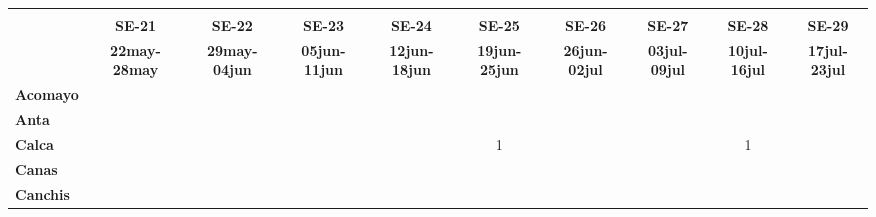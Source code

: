 \begin{tabular}{lccccccccc}
	\textbf{}              	  & \multicolumn{1}{l}{}                        & \multicolumn{1}{l}{}      & \multicolumn{1}{l}{}                         & \multicolumn{1}{l}{}                         & \multicolumn{1}{l}{}                         & \multicolumn{1}{l}{}                        & \multicolumn{1}{l}{}                         & \multicolumn{1}{l}{}                         & \multicolumn{1}{l}{}     \\
	\textbf{}                                                                          		
	&\textbf{SE-21}								&\textbf{SE-22}
	&\textbf{SE-23}								&\textbf{SE-24}	
	&\textbf{SE-25}								&\textbf{SE-26}
	&\textbf{SE-27}								&\textbf{SE-28}
	&\textbf{SE-29}\\
	\textbf{}              	  		
	&\textbf{22may-28may}
	&\textbf{29may-04jun}						&\textbf{05jun-11jun}
	&\textbf{12jun-18jun}						&\textbf{19jun-25jun}
	&\textbf{26jun-02jul}						&\textbf{03jul-09jul}
	&\textbf{10jul-16jul}						&\textbf{17jul-23jul}\\
	\textbf{Acomayo}                        		
	&\cellcolor[HTML]{FCC46C}					&\cellcolor[HTML]{FCC46C}
	&\cellcolor[HTML]{FCC46C}					&\cellcolor[HTML]{FCC46C}
	&\cellcolor[HTML]{FCC46C}					&\cellcolor[HTML]{FCC46C}
	&\cellcolor[HTML]{FCC46C}					&\cellcolor[HTML]{FCC46C}
	&\cellcolor[HTML]{FCC46C}\\
	\textbf{Anta}                                                   		
	&\cellcolor[HTML]{FCC46C}
	&\cellcolor[HTML]{FCC46C}					&\cellcolor[HTML]{FCC46C}
	&\cellcolor[HTML]{FCC46C} 					&\cellcolor[HTML]{FCC46C}
	&\cellcolor[HTML]{FCC46C}					&\cellcolor[HTML]{FCC46C}
	&\cellcolor[HTML]{FCC46C}					&\cellcolor[HTML]{FCC46C}\\
	\textbf{Calca}      				       								            
	&\cellcolor[HTML]{FCC46C}   				&\cellcolor[HTML]{FCC46C}					&\cellcolor[HTML]{FCC46C}					&\cellcolor[HTML]{FCC46C}					&1											&\cellcolor[HTML]{FCC46C}				    &\cellcolor[HTML]{FCC46C}  					&1
	&\cellcolor[HTML]{FCC46C}\\             			
	\textbf{Canas}                              											
	&\cellcolor[HTML]{FCC46C}					&\cellcolor[HTML]{FCC46C}
	&\cellcolor[HTML]{FCC46C} 					&\cellcolor[HTML]{FCC46C}
	&\cellcolor[HTML]{FCC46C}					&\cellcolor[HTML]{FCC46C}
	&\cellcolor[HTML]{FCC46C}					&\cellcolor[HTML]{FCC46C}
	&\cellcolor[HTML]{FCC46C}\\
	\textbf{Canchis}                             											
	&\cellcolor[HTML]{FCC46C}					&\cellcolor[HTML]{FCC46C}					&\cellcolor[HTML]{FCC46C}					&\cellcolor[HTML]{FCC46C}					&\cellcolor[HTML]{FCC46C}					&\cellcolor[HTML]{FCC46C}					&\cellcolor[HTML]{FCC46C}					&\cellcolor[HTML]{FCC46C}

\end{tabular}
